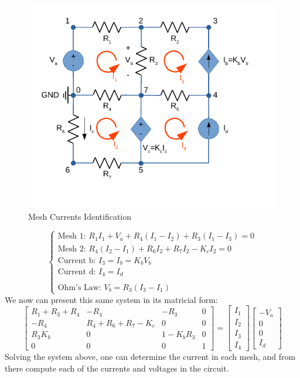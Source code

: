 \begin{figure}[h] \centering
  \includegraphics[width=0.7\linewidth]{MeshMethod.pdf}
  \caption{Mesh Currents Identification}
  \label{fig:MeshMethod}
\end{figure}

$$
\begin{cases}
  \text{Mesh 1: } R_{1}I_{1}+V_{a}+R_{4}(I_{1}-I_{2})+R_{3}(I_{1}-I_{3}) = 0\\
  \text{Mesh 2: } R_{4}(I_{2}-I_{1})+R_{6}I_{2}+R_{7}I_{2}-K_{c}I_{2} = 0\\
  \text{Current b: } I_{3} = I_{b} = K_{b}V_{b}\\
  \text{Current d: } I_{4} = I_{d}\\
  \\
  \text{Ohm's Law: } V_{b} = R_{3}(I_{3}-I_{1})
\end{cases}
$$
We now can present this same system in its matricial form:
$$
\begin{bmatrix}
  R_{1}+R_{3}+R_{4} & -R_{4} & -R_{3} & 0 \\
  -R_{4} & R_{4}+R_{6}+R_{7}-K_{c} & 0 & 0\\
  R_{3}K_{b} & 0 & 1-K_{b}R_{3} & 0\\
  0 & 0 & 0 & 1
\end{bmatrix}
=
\begin{bmatrix}
  I_{1}\\
  I_{2}\\
  I_{3}\\
  I_{4}
\end{bmatrix}
\begin{bmatrix}
  -V_{a}\\
  0\\
  0\\
  I_{d}
\end{bmatrix}
$$
Solving the system above, one can determine the current in each mesh, and from there compute each of the currents and voltages in the circuit.


